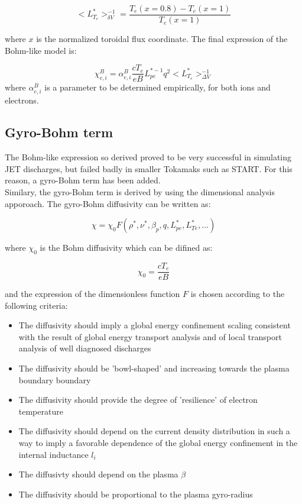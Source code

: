 \documentclass{article}    %
\begin{document}
\[ <L_{T_{e}}^*>_{\delta V}^{-1} = \frac{T_{e}(x=0.8) - T_{e}(x=1)}{T_{e}(x=1)}\]

where $x$ is the normalized toroidal flux coordinate. The final expression of the Bohm-like model is:\hfill

\[ \chi_{e,i}^B = \alpha_{e,i}^{B} \frac{cT_{e}}{eB} L_{pe}^{*-1} q^2 <L_{T_{e}}^*>_{\Delta V}^{-1}\]
where $\alpha_{e,i}^{B}$ is a parameter to be determined empirically, for both ions and electrons.\hfill 

\subsection{Gyro-Bohm term}

The Bohm-like expression so derived proved to be very successful in simulating JET discharges, but failed badly in smaller Tokamaks
such as START\cite{roa96}.  For this reason, a gyro-Bohm term has been added.\\
Similary, the gyro-Bohm term is derived by using the dimensional analysis apporoach. The gyro-Bohm diffusivity can be written as:\hfill

\[ \chi = \chi_{0} F( \rho^*, \nu^*, \beta_p, q, L_{pe}^{*}, L_{Te}^{*},... )\]

where $\chi_{0}$ is the Bohm diffusivity which can be difined as:\hfill

\[ \chi_{0} = \frac{cT_e}{eB}\]

and the expression of the dimensionless function $F$ is chosen according to the following criteria:\

\begin{itemize}
\item The diffusivity should imply a global energy confinement scaling consistent with the result of global energy transport analysis and of local transport analysis of well diagnosed discharges 
\item The diffusivity should be 'bowl-shaped' and increasing towards the plasma boundary boundary
\item The diffusivity should provide the degree of 'resilience' of electron temperature
\item The diffusivity should depend on the current density distribution in such a way to imply a favorable dependence of the global energy confinement in the internal inductance $l_i$
\item The diffusivty should depend on the plasma $\beta$ 
\item The diffusivity should be proportional to the plasma gyro-radius
\end{itemize}
\end{document}
